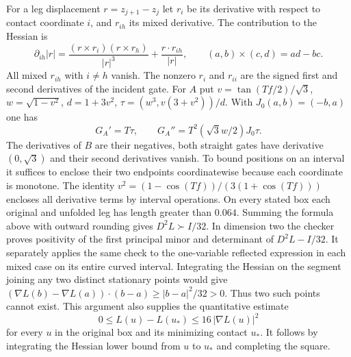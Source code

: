 For a leg displacement $r=z_{j+1}-z_j$ let $r_i$ be its derivative with
respect to contact coordinate $i$, and $r_{ih}$ its mixed derivative.
The contribution to the Hessian is
\[
 \partial_{ih}|r|=
 \frac{(r\times r_i)(r\times r_h)}{|r|^3}
       +\frac{r\cdot r_{ih}}{|r|},
 \qquad (a,b)\times(c,d)=ad-bc .
\]
All mixed $r_{ih}$ with $i\ne h$ vanish. The nonzero $r_i$ and $r_{ii}$
are the signed first and second derivatives of the incident gate.
For $A$ put $v=\tan(Tf/2)/\sqrt3$, $w=\sqrt{1-v^2}$,
$d=1+3v^2$, $\tau=(w^3,v(3+v^2))/d$. With $J_0(a,b)=(-b,a)$ one has
\[
 G_A'=T\tau,\qquad G_A''=T^2(\sqrt3 w/2)J_0\tau .
\]
The derivatives of $B$ are their negatives, both straight gates have
derivative $(0,\sqrt3)$ and their second derivatives vanish.
To bound positions on an interval it suffices to enclose their two
endpoints coordinatewise because each coordinate is monotone. The
identity $v^2=(1-\cos(Tf))/(3(1+\cos(Tf)))$ encloses all derivative
terms by interval operations. On every stated box each original and
unfolded leg has length greater than $0.064$. Summing the formula
above with outward rounding gives $D^2 L\succ I/32$. In dimension two
the checker proves positivity of the first principal minor and determinant
of $D^2L-I/32$. It separately applies the same check to the one-variable
reflected expression in each mixed case on its entire curved interval.
Integrating the Hessian on the segment joining any two distinct stationary
points would give
$(\nabla L(b)-\nabla L(a))\cdot(b-a)\ge |b-a|^2/32>0$.
Thus two such points cannot exist. This argument also supplies the
quantitative estimate
\[
       0\le L(u)-L(u_*)\le 16\,|\nabla L(u)|^2
\]
for every $u$ in the original box and its minimizing contact $u_*$. It
follows by integrating the Hessian lower bound from $u$ to $u_*$ and
completing the square.
